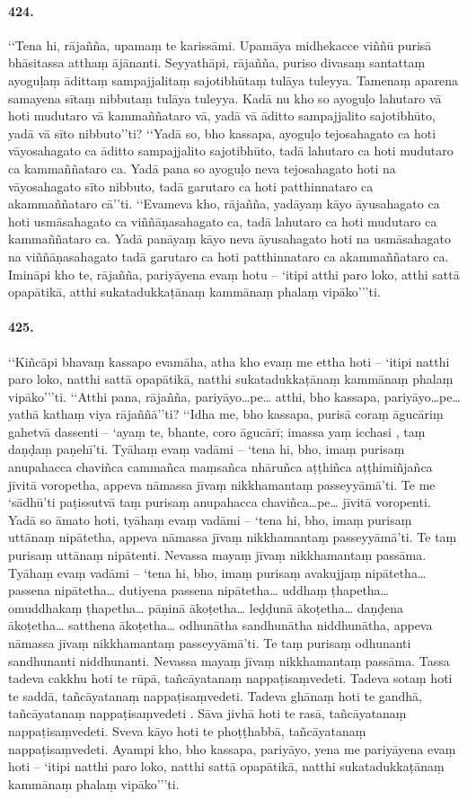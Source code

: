 \paragraph{424.} ‘‘Tena hi, rājañña, upamaṃ te karissāmi. Upamāya midhekacce viññū purisā bhāsitassa atthaṃ ājānanti. Seyyathāpi, rājañña, puriso divasaṃ santattaṃ ayoguḷaṃ ādittaṃ sampajjalitaṃ sajotibhūtaṃ tulāya tuleyya. Tamenaṃ aparena samayena sītaṃ nibbutaṃ tulāya tuleyya. Kadā nu kho so ayoguḷo lahutaro vā hoti mudutaro vā kammaññataro vā, yadā vā āditto sampajjalito sajotibhūto, yadā vā sīto nibbuto’’ti? ‘‘Yadā so, bho kassapa, ayoguḷo tejosahagato ca hoti vāyosahagato ca āditto sampajjalito sajotibhūto, tadā lahutaro ca hoti mudutaro ca kammaññataro ca. Yadā pana so ayoguḷo neva tejosahagato hoti na vāyosahagato sīto nibbuto, tadā garutaro ca hoti patthinnataro ca akammaññataro cā’’ti. ‘‘Evameva kho, rājañña, yadāyaṃ kāyo āyusahagato ca hoti usmāsahagato ca viññāṇasahagato ca, tadā lahutaro ca hoti mudutaro ca kammaññataro ca. Yadā panāyaṃ kāyo neva āyusahagato hoti na usmāsahagato na viññāṇasahagato tadā garutaro ca hoti patthinnataro ca akammaññataro ca. Imināpi kho te, rājañña, pariyāyena evaṃ hotu – ‘itipi atthi paro loko, atthi sattā opapātikā, atthi sukatadukkaṭānaṃ kammānaṃ phalaṃ vipāko’’’ti.

\paragraph{425.} ‘‘Kiñcāpi bhavaṃ kassapo evamāha, atha kho evaṃ me ettha hoti – ‘itipi natthi paro loko, natthi sattā opapātikā, natthi sukatadukkaṭānaṃ kammānaṃ phalaṃ vipāko’’’ti. ‘‘Atthi pana, rājañña, pariyāyo…pe… atthi, bho kassapa, pariyāyo…pe… yathā kathaṃ viya rājaññā’’ti? ‘‘Idha me, bho kassapa, purisā coraṃ āgucāriṃ gahetvā dassenti – ‘ayaṃ te, bhante, coro āgucārī; imassa yaṃ icchasi , taṃ daṇḍaṃ paṇehī’ti. Tyāhaṃ evaṃ vadāmi – ‘tena hi, bho, imaṃ purisaṃ anupahacca chaviñca cammañca maṃsañca nhāruñca aṭṭhiñca aṭṭhimiñjañca jīvitā voropetha, appeva nāmassa jīvaṃ nikkhamantaṃ passeyyāmā’ti. Te me ‘sādhū’ti paṭissutvā taṃ purisaṃ anupahacca chaviñca…pe… jīvitā voropenti. Yadā so āmato hoti, tyāhaṃ evaṃ vadāmi – ‘tena hi, bho, imaṃ purisaṃ uttānaṃ nipātetha, appeva nāmassa jīvaṃ nikkhamantaṃ passeyyāmā’ti. Te taṃ purisaṃ uttānaṃ nipātenti. Nevassa mayaṃ jīvaṃ nikkhamantaṃ passāma. Tyāhaṃ evaṃ vadāmi – ‘tena hi, bho, imaṃ purisaṃ avakujjaṃ nipātetha… passena nipātetha… dutiyena passena nipātetha… uddhaṃ ṭhapetha… omuddhakaṃ ṭhapetha… pāṇinā ākoṭetha… leḍḍunā ākoṭetha… daṇḍena ākoṭetha… satthena ākoṭetha… odhunātha sandhunātha niddhunātha, appeva nāmassa jīvaṃ nikkhamantaṃ passeyyāmā’ti. Te taṃ purisaṃ odhunanti sandhunanti niddhunanti. Nevassa mayaṃ jīvaṃ nikkhamantaṃ passāma. Tassa tadeva cakkhu hoti te rūpā, tañcāyatanaṃ nappaṭisaṃvedeti. Tadeva sotaṃ hoti te saddā, tañcāyatanaṃ nappaṭisaṃvedeti. Tadeva ghānaṃ hoti te gandhā, tañcāyatanaṃ nappaṭisaṃvedeti . Sāva jivhā hoti te rasā, tañcāyatanaṃ nappaṭisaṃvedeti. Sveva kāyo hoti te phoṭṭhabbā, tañcāyatanaṃ nappaṭisaṃvedeti. Ayampi kho, bho kassapa, pariyāyo, yena me pariyāyena evaṃ hoti – ‘itipi natthi paro loko, natthi sattā opapātikā, natthi sukatadukkaṭānaṃ kammānaṃ phalaṃ vipāko’’’ti.

